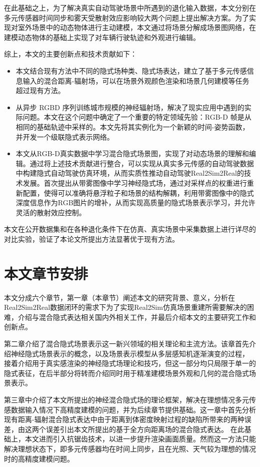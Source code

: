 在此基础之上，为了解决真实自动驾驶场景中所遇到的退化输入数据，本文分别在多元传感器时间同步和雾天受散射效应影响较大两个问题上提出解决方案。为了实现对室外场景中的动态物体进行主动建模，本文通过将场景分解成场景图网络，在建模动态物体的基础上实现了对车辆行驶轨迹和外观进行编辑。

综上，本文的主要创新点和技术贡献如下：
\begin{itemize}
    \item 本文结合现有方法中不同的隐式场种类、隐式场表达，建立了基于多元传感信息输入的混合距离-辐射场，可以在场景外观颜色渲染和场景几何建模等任务超过现有方法。
    \item 从异步 RGBD 序列训练城市规模的神经辐射场，解决了现实应用中遇到的实际问题。本文在这个问题中确定了一个重要的特定领域先验：RGB-D 帧是从相同的基础轨迹中采样的。本文先将其实例化为一个新颖的时间-姿势函数，并开发一个级联隐式表示网络。
    \item 本文从RGB-D真实数据中学习混合隐式场景图，实现了对动态场景的理解和编辑。通过将上述技术贡献进行整合，可以实现从真实多元传感的自动驾驶数据中构建隐式自动驾驶仿真环境，从而实质性推动自动驾驶Real2Sim2Real的技术发展。首次提出从带雾图像中学习神经隐式场，通过对采样点的权重进行重新配置，使得可以准确将悬浮粒子和场景的结构解耦，利用带雾图像中的隐式深度信息作为RGB图片的增补，从而实现高质量的隐式场景表示学习，并允许灵活的散射效应控制。
\end{itemize}

本文在公开数据集和在各种退化条件下在仿真、真实场景中采集数据上进行详尽的对比实验，验证了本论文所提出方法显著优于现有方法。


\section{本文章节安排}
本文分成六个章节，第一章（本章节）阐述本文的研究背景、意义，分析在Real2Sim2Real数据闭环的需求下为了实现Real2Sim仿真场景重建所需要解决的困难，介绍与混合隐式表达相关国内外相关工作，并最后介绍本文的主要研究工作和创新点。

第二章介绍了混合隐式场景表示这一新兴领域的相关理论和主流方法。该章首先介绍神经隐式场景表示的概念，以及场景表示模型从多层感知机逐渐演变的过程， 接着介绍用于真实感渲染的神经隐式场理论和技巧，但这一部分均只局限于单一的隐式表征，在后半部分将转而介绍同时用于精准建模场景外观和几何的混合隐式场景表示。

第三章中介绍了本文所提出的神经混合隐式场的理论框架，解决在理想情况多元传感数据输入情况下高精度建模的问题，并为后续章节提供基础。这一章中首先分析现有距离-辐射混合隐式表达中由于距离到体密度映射过程的缺陷所带来的两种误差，由这两个误差引出本文所提出的基于全方向距离场的混合隐式表达。 在此基础上，本文进而引入抗锯齿技术，以进一步提升渲染画面质量。然而这一方法只能解决理想状态下，即多元传感器均在时间上同步，且在光照、天气较为理想的情况时的高精度建模问题。

